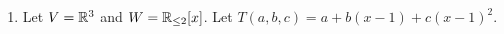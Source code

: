 \documentclass{amsart}
\begin{document}
	\begin{enumerate}
		\item 	Let $V=\mathbb{R}^3$ and $W = \mathbb{R}_{\leq 2}[x]$. Let $T(a,b,c)=a+b(x-1)+c(x-1)^2$.
	 	\end{enumerate}
	 	
	
\end{document}
